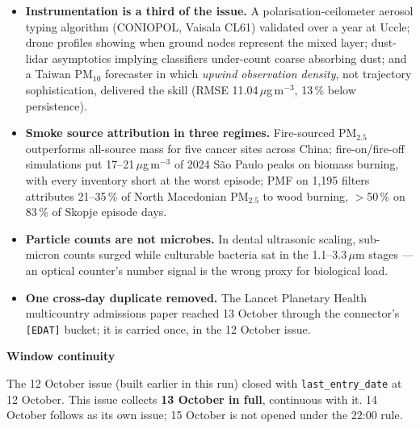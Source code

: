 \documentclass[10pt]{article}
\begin{document}
\footnotesize
\begin{itemize}

\item \textbf{Instrumentation is a third of the issue.} A polarisation-ceilometer aerosol typing algorithm
(CONIOPOL, Vaisala CL61) validated over a year at Uccle; drone profiles showing when ground nodes represent the
mixed layer; dust-lidar asymptotics implying classifiers under-count coarse absorbing dust; and a Taiwan PM$_{10}$
forecaster in which \textit{upwind observation density}, not trajectory sophistication, delivered the skill
(RMSE 11.04\,$\mu$g\,m$^{-3}$, 13\,\% below persistence).

\item \textbf{Smoke source attribution in three regimes.} Fire-sourced PM$_{2.5}$ outperforms all-source mass for
five cancer sites across China; fire-on/fire-off simulations put 17--21\,$\mu$g\,m$^{-3}$ of 2024 S\~ao Paulo
peaks on biomass burning, with every inventory short at the worst episode; PMF on 1,195 filters attributes
21--35\,\% of North Macedonian PM$_{2.5}$ to wood burning, $>$50\,\% on 83\,\% of Skopje episode days.

\item \textbf{Particle counts are not microbes.} In dental ultrasonic scaling, sub-micron counts surged while
culturable bacteria sat in the 1.1--3.3\,$\mu$m stages --- an optical counter's number signal is the wrong
proxy for biological load.

\item \textbf{One cross-day duplicate removed.} The Lancet Planetary Health multicountry admissions paper reached
13 October through the connector's \texttt{[EDAT]} bucket; it is carried once, in the 12 October issue.

\end{itemize}

\vspace{2mm}

\begin{keybox}
{\sffamily\bfseries\footnotesize\color{Deep}Window continuity}\\[1.2mm]
{\fontsize{7.2}{8.8}\selectfont
The 12 October issue (built earlier in this run) closed with \texttt{last\_entry\_date} at 12 October.
This issue collects \textbf{13 October in full}, continuous with it. 14 October follows as its own issue;
15 October is not opened under the 22:00 rule.\par}
\end{keybox}
\end{document}
